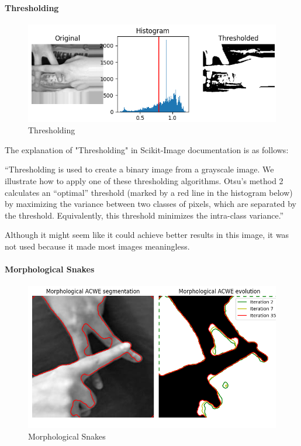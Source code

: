 \documentclass{article}
\begin{document}
\begin{flushleft}
\paragraph{Thresholding}
\begin{figure}[h]
    \centering
    \vspace{-5mm}
    \includegraphics[scale=0.6]{images/thresholding.png}
    \caption{Thresholding}
    \label{fig:thresholding}
\end{figure}

The explanation of "Thresholding" in Scikit-Image documentation is as follows:

``Thresholding is used to create a binary image from a grayscale image. We illustrate how to apply one of these thresholding algorithms. Otsu’s method 2 calculates an “optimal” threshold (marked by a red line in the histogram below) by maximizing the variance between two classes of pixels, which are separated by the threshold. Equivalently, this threshold minimizes the intra-class variance.''

Although it might seem like it could achieve better results in this image, it was not used because it made most images meaningless.

\paragraph{Morphological Snakes}
\begin{figure}[h]
    \centering
    \vspace{-5mm}
    \includegraphics[scale=0.5]{images/morphological_snakes.png}
    \caption{Morphological Snakes}
    \label{fig:morphological_snakes}
\end{figure}


\end{flushleft}
\end{document}
